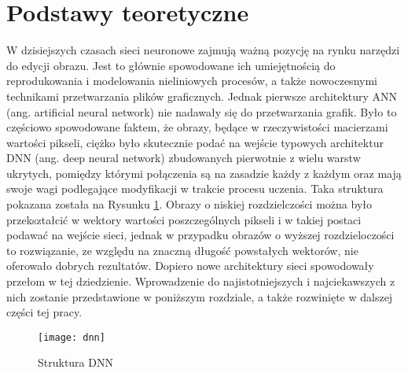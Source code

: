 \section{Podstawy teoretyczne}

  W dzisiejszych czasach sieci neuronowe zajmują ważną pozycję na rynku narzędzi
  do edycji obrazu. Jest to głównie spowodowane ich umiejętnością do
  reprodukowania i modelowania nieliniowych procesów, a także nowoczesnymi
  technikami przetwarzania plików graficznych.
  Jednak pierwsze architektury ANN (ang. artificial neural network) nie nadawały
  się do przetwarzania grafik.
  Było to częściowo spowodowane faktem, że obrazy, będące w rzeczywistości macierzami
  wartości pikseli,
  ciężko było skutecznie podać
  na wejście typowych architektur DNN (ang. deep neural network) zbudowanych
  pierwotnie z wielu warstw ukrytych, pomiędzy którymi połączenia są na zasadzie
  każdy z każdym oraz mają swoje wagi podlegające modyfikacji w trakcie procesu
  uczenia. Taka struktura pokazana została na Rysunku \ref{fig:dnn}.
  Obrazy o niskiej rozdzielczości można było przekształcić w wektory
  wartości poszczególnych pikseli i w takiej postaci podawać na wejście sieci,
  jednak w przypadku obrazów o wyższej rozdzieloczości to rozwiązanie, ze
  względu na znaczną długość powstałych wektorów, nie oferowało dobrych
  rezultatów.
  Dopiero nowe architektury sieci spowodowały przełom w tej dziedzienie.
  Wprowadzenie do najistotniejszych i najciekawszych z nich zostanie przedstawione w
  poniższym rozdziale, a także rozwinięte w dalszej części tej pracy.


  \begin{figure}[h]
    \centering
    \texttt{[image: dnn]}
    \caption{Struktura DNN}
    \label{fig:dnn}
  \end{figure}


